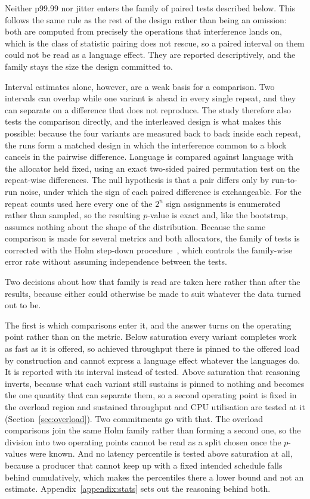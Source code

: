 \documentclass[english,twoside,openright,a4paper,censored,csm,software-track-2020]{HYthesisML}
\begin{document}
Neither p99.99 nor jitter enters the family of paired tests described below. This
follows the same rule as the rest of the design rather than being an omission: both are
computed from precisely the operations that interference lands on, which is the class of
statistic pairing does not rescue, so a paired interval on them could not be read as a language
effect. They are reported descriptively, and the family stays the size the design committed to.

Interval estimates alone, however, are a weak basis for a comparison. Two intervals can overlap
while one variant is ahead in every single repeat, and they can separate on a difference that
does not reproduce. The study therefore also tests the comparison directly, and the interleaved
design is what makes this possible: because the four variants are measured back to back inside
each repeat, the runs form a matched design in which the interference common to a block cancels
in the pairwise difference. Language is compared against language with the allocator held
fixed, using an exact two-sided paired permutation test on the repeat-wise differences. The
null hypothesis is that a pair differs only by run-to-run noise, under which the sign of each
paired difference is exchangeable. For the repeat counts used here every one of the $2^{n}$
sign assignments is enumerated rather than sampled, so the resulting $p$-value is exact and,
like the bootstrap, assumes nothing about the shape of the distribution. Because the same
comparison is made for several metrics and both allocators, the family of tests is corrected
with the Holm step-down procedure~\cite{holm1979simple}, which controls the family-wise error
rate without assuming independence between the tests.

Two decisions about how that family is read are taken here rather than after the results,
because either could otherwise be made to suit whatever the data turned out to be.

The first is which comparisons enter it, and the answer turns on the operating point rather than
on the metric. Below saturation every variant completes work as fast as it is offered, so achieved
throughput there is pinned to the offered load by construction and cannot express a language
effect whatever the languages do. It is reported with its interval instead of tested. Above
saturation that reasoning inverts, because what each variant still sustains is pinned to nothing
and becomes the one quantity that can separate them, so a second operating point is fixed in the
overload region and sustained throughput and CPU utilisation are tested at it
(Section~\ref{sec:overload}). Two commitments go with that. The overload comparisons join the same
Holm family rather than forming a second one, so the division into two operating points cannot be
read as a split chosen once the $p$-values were known. And no latency percentile is tested above
saturation at all, because a producer that cannot keep up with a fixed intended schedule falls
behind cumulatively, which makes the percentiles there a lower bound and not an estimate.
Appendix~\ref{appendix:stats} sets out the reasoning behind both.
\end{document}
